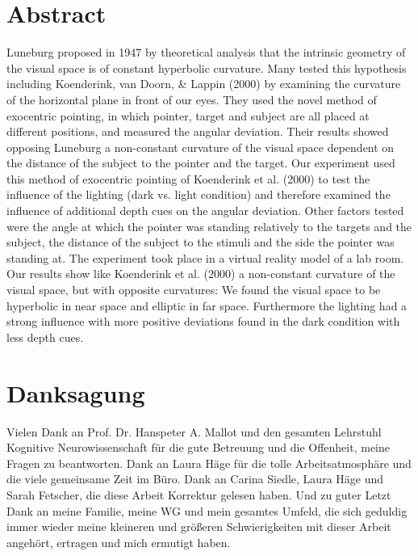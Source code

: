\documentclass[twoside,12pt,a4paper]{report}
\begin{document}
\section*{Abstract}
Luneburg proposed in 1947 by theoretical analysis that the intrinsic geometry of the visual space is of constant hyperbolic curvature. Many tested this hypothesis including Koenderink, van Doorn, \& Lappin (2000) by examining the curvature of the horizontal plane in front of our eyes. They used the novel method of exocentric pointing, in which pointer, target and subject are all placed at different positions, and measured the angular deviation. Their results showed opposing Luneburg a non-constant curvature of the visual space dependent on the distance of the subject to the pointer and the target. Our experiment used this method of exocentric pointing of Koenderink et al. (2000) to test the influence of the lighting (dark vs. light condition) and therefore examined the influence of additional depth cues on the angular deviation. Other factors tested were the angle at which the pointer was standing relatively to the targets and the subject, the distance of the subject to the stimuli and the side the pointer was standing at. The experiment took place in a virtual reality model of a lab room. Our results show like Koenderink et al. (2000) %
a non-constant curvature of the visual space, but with opposite curvatures: We found the visual space to be hyperbolic in near space and elliptic in far space. Furthermore the lighting had a strong influence with more positive deviations found in the dark condition with less depth cues. 
\newpage

\section*{Danksagung}
Vielen Dank an Prof. Dr. Hanspeter A. Mallot und den gesamten Lehrstuhl Kognitive Neurowissenschaft für die gute Betreuung und die Offenheit, meine Fragen zu beantworten. Dank an Laura Häge für die tolle Arbeitsatmosphäre und die viele gemeinsame Zeit im Büro. Dank an Carina Siedle, Laura Häge und Sarah Fetscher, die diese Arbeit Korrektur gelesen haben.
Und zu guter Letzt Dank an meine Familie, meine WG und mein gesamtes Umfeld, die sich geduldig immer wieder meine kleineren und größeren Schwierigkeiten mit dieser Arbeit angehört, ertragen und mich ermutigt haben.
\newpage
\renewcommand{\baselinestretch}{1.3}
\small\normalsize
\end{document}
